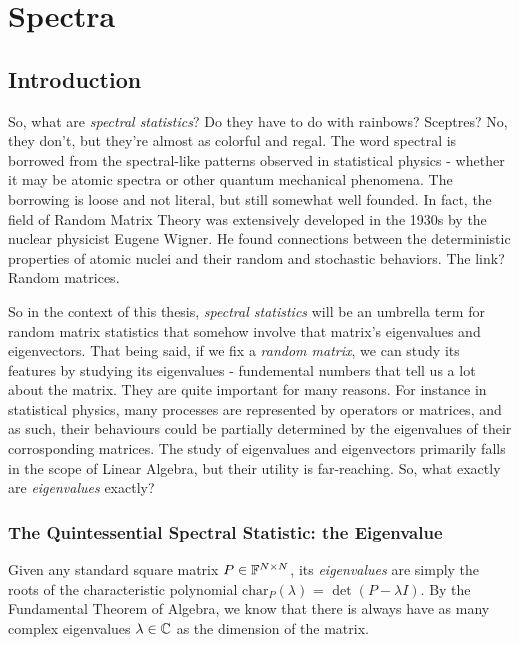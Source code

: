 
\chapter{Spectra}


\section{Introduction}
So, what are \textit{spectral statistics}? Do they have to do with rainbows? Sceptres? No, they don’t, but they’re almost as colorful and regal. The word spectral is borrowed from the spectral-like patterns observed in statistical physics - whether it may be atomic spectra or other quantum mechanical phenomena. The borrowing is loose and not literal, but still somewhat well founded. In fact, the field of Random Matrix Theory was extensively developed in the 1930s by the nuclear physicist Eugene Wigner. He found connections between the deterministic properties of atomic nuclei and their random and stochastic behaviors. The link? Random matrices. \newline

So in the context of this thesis, \textit{spectral statistics} will be an umbrella term for random matrix statistics that somehow involve that matrix's eigenvalues and eigenvectors. That being said, if we fix a \textit{random matrix}, we can study its features by studying its eigenvalues - fundemental numbers that tell us a lot about the matrix. They are quite important for many reasons. For instance in statistical physics, many processes are represented by operators or matrices, and as such, their behaviours could be partially determined by the eigenvalues of their corrosponding matrices. The study of eigenvalues and eigenvectors primarily falls in the scope of Linear Algebra, but their utility is far-reaching. So, what exactly are \textit{eigenvalues} exactly?


\subsection{The Quintessential Spectral Statistic: the Eigenvalue}
Given any standard square matrix $P \in \mathbb{F}^{N \times N}$, its \textit{eigenvalues} are simply the roots of the characteristic polynomial $\text{char}_P{(\lambda)}$ = $\det(P - \lambda I)$. By the Fundamental Theorem of Algebra, we know that there is always have as many complex eigenvalues $\lambda \in \mathbb{C}$ as the dimension of the matrix.

